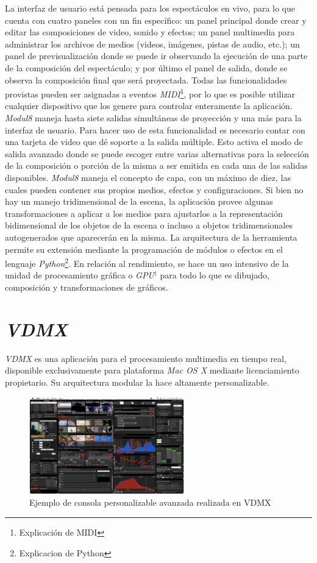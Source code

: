 La interfaz de usuario está pensada para los espectáculos en vivo, para lo que cuenta con cuatro paneles con un fin específico: un panel principal donde crear y editar las composiciones de video, sonido y efectos; un panel multimedia para administrar los archivos de medios (videos, imágenes, pistas de audio, etc.); un panel de previsualización donde se puede ir observando la ejecución de una parte de la composición del espectáculo; y por último el panel de salida, donde se observa la composición final que será proyectada. Todas las funcionalidades provistas pueden ser asignadas a eventos \emph{MIDI}\footnote{Explicación de MIDI}, por lo que es posible utilizar cualquier dispositivo que los genere para controlar enteramente la aplicación.
\emph{Modul8} maneja hasta siete salidas simultáneas de proyección y una más para la interfaz de usuario. Para hacer uso de esta funcionalidad es necesario contar con una tarjeta de video que dé soporte a la salida múltiple. Esto activa el modo de salida avanzado donde se puede escoger entre varias alternativas para la selección de la composición o porción de la misma a ser emitida en cada una de las salidas disponibles. \emph{Modul8} maneja el concepto de capa, con un máximo de diez, las cuales pueden contener sus propios medios, efectos y configuraciones.
Si bien no hay un manejo tridimensional de la escena, la aplicación provee algunas transformaciones a aplicar a los medios para ajustarlos a la representación bidimensional de los objetos de la escena o incluso a objetos tridimensionales autogenerados que aparecerán en la misma.
La arquitectura de la herramienta permite su extensión mediante la programación de módulos o efectos en el lenguaje \emph{Python}\footnote{Explicacion de Python}.
En relación al rendimiento, se hace un uso intensivo de la unidad de procesamiento gráfica o \emph{GPU}$^\dagger$ para todo lo que es dibujado, composición y transformaciones de gráficos.

\section{\emph{VDMX}}
\emph{VDMX} \cite{VDMX} es una aplicación para el procesamiento multimedia en tiempo real, disponible exclusivamente para plataforma \emph{Mac OS X} mediante licenciamiento propietario. Su arquitectura modular la hace altamente personalizable.

\begin{figure}[H]
  \centering
    \includegraphics[width=0.6\textwidth]{./Apendices/Cap3_aplicaciones/apps-vdmx.png}
  \caption{Ejemplo de consola personalizable avanzada realizada en VDMX} %
  \label{fig:Apps-VDMX}
\end{figure}

